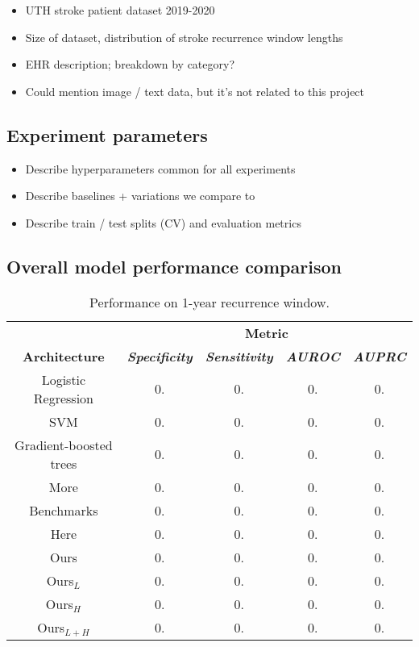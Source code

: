 \documentclass[conference]{IEEEtran}
\begin{document}
\begin{itemize}
    \item UTH stroke patient dataset 2019-2020
    \item Size of dataset, distribution of stroke recurrence window lengths
    \item EHR description; breakdown by category?
    \item Could mention image / text data, but it's not related to this project
\end{itemize}

\subsection{Experiment parameters}
\begin{itemize}
    \item Describe hyperparameters common for all experiments
    \item Describe baselines + variations we compare to
    \item Describe train / test splits (CV) and evaluation metrics
\end{itemize}

\subsection{Overall model performance comparison}

\begin{table}[htbp]
    \caption{Performance on 1-year recurrence window.}
    \begin{center}
    \begin{tabular}{|c|c|c|c|c|}
    \hline
    &\multicolumn{4}{|c|}{\textbf{Metric}} \\
    \cline{2-5} 
    \textbf{Architecture} & \textbf{\textit{Specificity}}& \textbf{\textit{Sensitivity}}& \textbf{\textit{AUROC}} &\textbf{\textit{AUPRC}}\\
    \hline
    Logistic Regression& 0. & 0. & 0. & 0. \\
    \hline
    SVM& 0. & 0. & 0. & 0. \\
    \hline
    Gradient-boosted trees& 0. & 0. & 0. & 0. \\
    \hline
    More& 0. & 0. & 0. & 0. \\
    \hline
    Benchmarks& 0. & 0. & 0. & 0. \\
    \hline
    Here& 0. & 0. & 0. & 0. \\
    \hline
    Ours& 0. & 0. & 0. & 0. \\
    \hline
    Ours$_L$& 0. & 0. & 0. & 0. \\
    \hline
    Ours$_H$& 0. & 0. & 0. & 0. \\
    \hline
    Ours$_{L+H}$& 0. & 0. & 0. & 0. \\
    \hline
    \end{tabular}
    \label{tab1}
    \end{center}
    \end{table}
\end{document}
